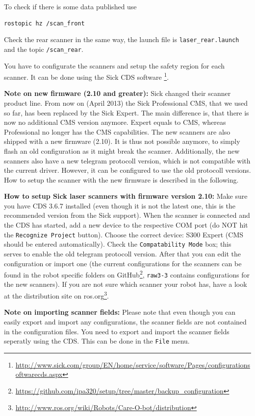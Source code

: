 To check if there is some data published use
\begin{lstlisting}
rostopic hz /scan_front
\end{lstlisting}

Check the rear scanner in the same way, the launch file is \texttt{laser\_rear.launch} and the topic \texttt{/scan\_rear}.

You have to configurate the scanners and setup the safety region for each scanner. It can be done using the Sick CDS software \footnote{\url{http://www.sick.com/group/EN/home/service/software/Pages/configurationsoftwarecds.aspx}}.

\textbf{Note on new firmware (2.10 and greater):} 
Sick changed their scanner product line. From now on (April 2013) the Sick Professional CMS, that we used so far, has been replaced by the Sick Expert.
The main difference is, that there is now no additional CMS version anymore.
Expert equals to CMS, whereas Professional no longer has the CMS capabilities.
The new scanners are also shipped with a new firmware (2.10).
It is thus not possible anymore, to simply flash an old configuration as it might break the scanner.
Additionally, the new scanners also have a new telegram protocoll version, which is not compatible with the current driver.
However, it can be configured to use the old protocoll versions.
How to setup the scanner with the new firmware is described in the following.

\textbf{How to setup Sick laser scanners with firmware version 2.10:}
Make sure you have CDS 3.6.7 installed (even though it is not the latest one, this is the recommended version from the Sick support).
When the scanner is connected and the CDS has started, add a new device to the respective COM port (do NOT hit the \texttt{Recognize Project} button).
Choose the correct device: S300 Expert (CMS should be entered automatically).
Check the \texttt{Compatability Mode} box; this serves to enable the old telegram protocoll version.
After that you can edit the configuration or import one (the current configurations for the scanners can be found in the robot specific folders on GitHub\footnote{\url{https://github.com/ipa320/setup/tree/master/backup_configuration}}, \texttt{raw3-3} contains configurations for the new scanners).
If you are not sure which scanner your robot has, have a look at the distribution site on ros.org\footnote{\url{http://www.ros.org/wiki/Robots/Care-O-bot/distribution}}.

\textbf{Note on importing scanner fields:}
Please note that even though you can easily export and import any configurations, the scanner fields are not contained in the configuration files.
You need to export and import the scanner fields seperatly using the CDS.
This can be done in the \texttt{File} menu.

